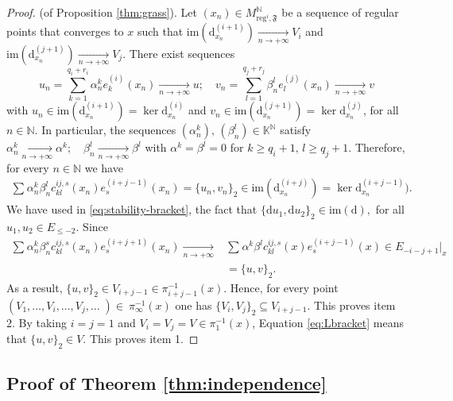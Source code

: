\documentclass[10pt]{article}
\theoremstyle{plain}
\theoremstyle{definition}
\theoremstyle{remark}
\newcommand{\dd}{\mathrm{d}}
\begin{document}
\begin{proof}{(of Proposition \ref{thm:grass}).}
\noindent
Let $(x_n)\in M_{\mathrm{reg}^{i},\mathfrak F}^{\mathbb{N}}$ be a sequence of regular points that converges to $x$ such that $\mathrm{im}(\dd^{(i+1)}_{x_n})\underset{n \to +\infty}{\longrightarrow} V_i$ and $\mathrm{im}(\dd^{(j+1)}_{x_n})\underset{n \to +\infty}{\longrightarrow}V_j$. There exist sequences $$u_n=\displaystyle{\sum_{k=1}^{q_{i}+r_{i}}\alpha_{n}^ke_k^{(i)}(x_n)}\underset{n \to +\infty}{\longrightarrow} u;\quad v_n=\displaystyle{\sum_{l=1}^{q_{j}+r_{j}}\beta_{n}^le_l^{(j)}(x_n)}\underset{n \to +\infty}{\longrightarrow} v$$ with $u_n\in \mathrm{im}(\dd^{(i+1)}_{x_n})=\ker\dd^{(i)}_{x_n}$ and $v_n\in \mathrm{im}(\dd^{(j+1)}_{x_n})=\ker\dd^{(j)}_{x_n}$, for all $n\in \mathbb{N}$. In particular, the sequences $(\alpha^k_{n}),\,(\beta^l_{n})\in \mathbb{K}^\mathbb{N}$ satisfy $\alpha^k_{n}\underset{n \to +\infty}{\longrightarrow} \alpha^k;\quad \beta_{n}^l\underset{n \to +\infty}{\longrightarrow} \beta^l$ with $\alpha^k=\beta^l=0$ for $k\geq q_{i}+1,\,l\geq q_{j}+1$. Therefore, for every $n\in\mathbb{N}$ we have
\begin{align}
    \sum_{}^{}\alpha^{k}_{n}\beta^{l}_{n}c_{k l}^{i j,s}(x_n)e_s^{(i+j-1)}(x_n)=\label{eq:stability-bracket}\{u_n,v_n\}_{2}\in \mathrm{im}(\dd^{(i+ j)}_{x_n})=\ker\dd^{(i+j-1)}_{x_n}).
\end{align}
We have used in \eqref{eq:stability-bracket}, the fact that $\{\dd  u_1, \dd u_2\}_2\in \mathrm{im}(\dd),$ for all $u_1,u_2\in E_{\leq -2}$.
Since \begin{align}
    \nonumber\sum_{}^{}\alpha^{k}_{n}\beta^{s}_{n}c_{kl}^{i j,s}(x_n)e_s^{(i+j+1)}(x_n)\underset{n \to+\infty}{\longrightarrow}& \sum_{}^{}\alpha^{k}\beta^{l}c_{kl}^{i j,s}(x)e_s^{(i+j-1)}(x)\in {E_{-i-j+1}}|_x\\\label{eq:Lbracket}&=\{u,v\}_{2}.
\end{align}As a result,  $\{u,v\}_{2}\in V_{i+j-1}\in \pi_{i+j-1}^{-1}(x)$. Hence, for every point $(V_1,\ldots, V_i,\ldots, V_j, \ldots\;)\in 
~\pi_{\infty}^{-1}(x)$ one has $\{V_i,V_j\}_{2}\subseteq V_{i+j-1}$. This proves item 2. By taking $i=j=1$ and $V_i=V_j=V\in \pi^{-1}_1(x)$, Equation \eqref{eq:Lbracket} means that $\{u, v\}_2\in V$. This proves item 1.
 \end{proof}


 
\subsection{Proof of Theorem \ref{thm:independence}}
\end{document}
